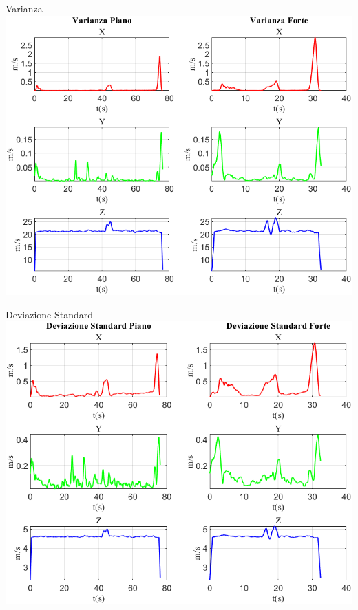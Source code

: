 	\begin{frame}{{Varianza}}
		\centering\includegraphics[height=.8\textheight]{figure/Vel/Varianza}
	\end{frame}
	
	\begin{frame}{{Deviazione Standard}}
		\centering\includegraphics[height=.8\textheight]{figure/Vel/Deviazione Standard}
	\end{frame}
	
